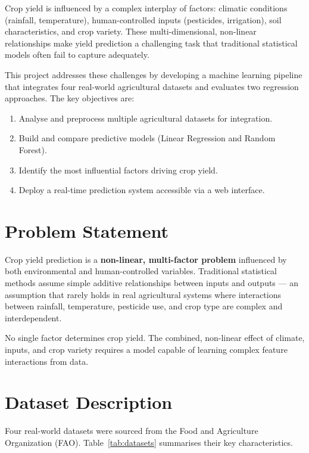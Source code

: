 \documentclass[12pt,a4paper]{article}
\newenvironment{insightbox}[1][Insight]{%
  \begin{mdframed}[linecolor=accent,linewidth=0.8pt,
    backgroundcolor=lightblue!25,
    innertopmargin=7pt,innerbottommargin=7pt,
    innerleftmargin=10pt,innerrightmargin=10pt,
    frametitle={\small\bfseries\color{white}\,#1},
    frametitlebackgroundcolor=accent,frametitlerule=false,
    frametitleaboveskip=3pt,frametitlebelowskip=3pt]\small
}{\end{mdframed}}
\begin{document}
Crop yield is influenced by a complex interplay of factors: climatic conditions
(rainfall, temperature), human-controlled inputs (pesticides, irrigation), soil
characteristics, and crop variety. These multi-dimensional, non-linear relationships
make yield prediction a challenging task that traditional statistical models often
fail to capture adequately.

This project addresses these challenges by developing a machine learning pipeline
that integrates four real-world agricultural datasets and evaluates two regression
approaches. The key objectives are:

\begin{enumerate}[label=\textbf{\arabic*.}, leftmargin=2.5em]
  \item Analyse and preprocess multiple agricultural datasets for integration.
  \item Build and compare predictive models (Linear Regression and Random Forest).
  \item Identify the most influential factors driving crop yield.
  \item Deploy a real-time prediction system accessible via a web interface.
\end{enumerate}

\section{Problem Statement}

Crop yield prediction is a \textbf{non-linear, multi-factor problem} influenced by
both environmental and human-controlled variables. Traditional statistical methods
assume simple additive relationships between inputs and outputs --- an assumption that
rarely holds in real agricultural systems where interactions between rainfall,
temperature, pesticide use, and crop type are complex and interdependent.

\begin{insightbox}[Key Challenge]
No single factor determines crop yield. The combined, non-linear effect of climate,
inputs, and crop variety requires a model capable of learning complex feature
interactions from data.
\end{insightbox}

\section{Dataset Description}

Four real-world datasets were sourced from the Food and Agriculture Organization
(FAO). Table~\ref{tab:datasets} summarises their key characteristics.
\end{document}
